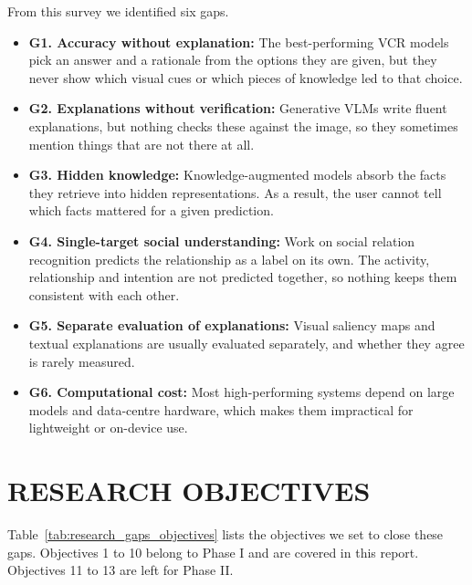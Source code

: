 From this survey we identified six gaps.
\begin{itemize}
\item \textbf{G1. Accuracy without explanation:} The best-performing VCR models pick an answer and a rationale from the options they are given, but they never show which visual cues or which pieces of knowledge led to that choice.
\item \textbf{G2. Explanations without verification:} Generative VLMs write fluent explanations, but nothing checks these against the image, so they sometimes mention things that are not there at all.
\item \textbf{G3. Hidden knowledge:} Knowledge-augmented models absorb the facts they retrieve into hidden representations. As a result, the user cannot tell which facts mattered for a given prediction.
\item \textbf{G4. Single-target social understanding:} Work on social relation recognition predicts the relationship as a label on its own. The activity, relationship and intention are not predicted together, so nothing keeps them consistent with each other.
\item \textbf{G5. Separate evaluation of explanations:} Visual saliency maps and textual explanations are usually evaluated separately, and whether they agree is rarely measured.
\item \textbf{G6. Computational cost:} Most high-performing systems depend on large models and data-centre hardware, which makes them impractical for lightweight or on-device use.
\end{itemize}

\section{RESEARCH OBJECTIVES}
\label{sec:objectives}

Table~\ref{tab:research_gaps_objectives} lists the objectives we set to close these gaps. Objectives 1 to 10 belong to Phase I and are covered in this report. Objectives 11 to 13 are left for Phase II.

